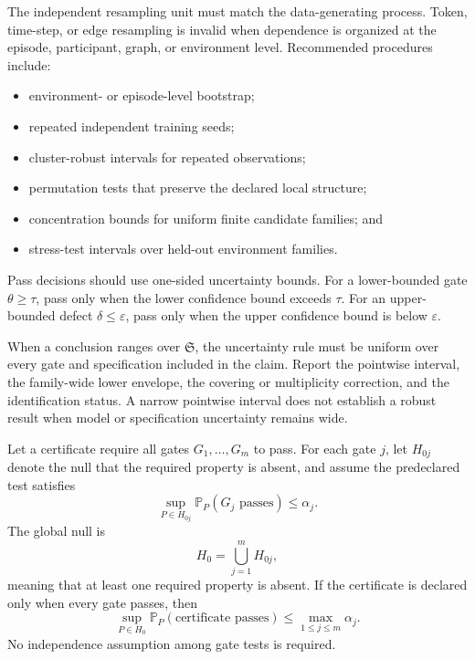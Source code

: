 The independent resampling unit must match the data-generating process. Token,
time-step, or edge resampling is invalid when dependence is organized at the
episode, participant, graph, or environment level. Recommended procedures
include:
\begin{itemize}
\item environment- or episode-level bootstrap;
\item repeated independent training seeds;
\item cluster-robust intervals for repeated observations;
\item permutation tests that preserve the declared local structure;
\item concentration bounds for uniform finite candidate families; and
\item stress-test intervals over held-out environment families.
\end{itemize}

Pass decisions should use one-sided uncertainty bounds. For a lower-bounded
gate \(\theta\geq\tau\), pass only when the lower confidence bound exceeds
\(\tau\). For an upper-bounded defect \(\delta\leq\varepsilon\), pass only when
the upper confidence bound is below \(\varepsilon\).

When a conclusion ranges over \(\mathfrak S\), the uncertainty rule must be
uniform over every gate and specification included in the claim. Report the
pointwise interval, the family-wide lower envelope, the covering or
multiplicity correction, and the identification status. A narrow pointwise
interval does not establish a robust result when model or specification
uncertainty remains wide.


\begin{theorem}
\label{thm:gatewise-validity}
Let a certificate require all gates \(G_1,\ldots,G_m\) to pass. For each gate
\(j\), let \(H_{0j}\) denote the null that the required property is absent, and
assume the predeclared test satisfies
\[
\sup_{P\in H_{0j}}
\mathbb P_P(G_j\text{ passes})
\leq
\alpha_j.
\]
The global null is
\[
H_0
=
\bigcup_{j=1}^m H_{0j},
\]
meaning that at least one required property is absent. If the certificate is
declared only when every gate passes, then
\[
\boxed{
\sup_{P\in H_0}
\mathbb P_P(\text{certificate passes})
\leq
\max_{1\leq j\leq m}\alpha_j.
}
\]
No independence assumption among gate tests is required.
\end{theorem}

